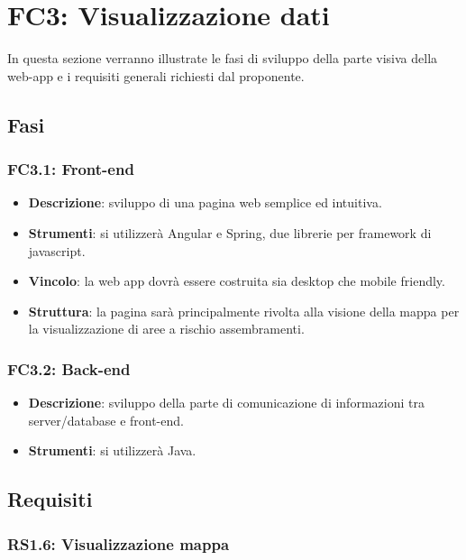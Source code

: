 \section{FC3: Visualizzazione dati}
In questa sezione verranno illustrate le fasi di sviluppo della parte visiva della web-app e i requisiti generali richiesti dal proponente.

\subsection{Fasi}

\subsubsection{FC3.1: Front-end}

\begin{itemize}
	\item \textbf{Descrizione}: sviluppo di una pagina web semplice ed intuitiva.
	\item \textbf{Strumenti}: si utilizzerà Angular e Spring, due librerie per framework di javascript.
	\item \textbf{Vincolo}: la web app dovrà essere costruita sia desktop che mobile friendly. 
	\item \textbf{Struttura}: la pagina sarà principalmente rivolta alla visione della mappa per la visualizzazione di aree a rischio assembramenti.
\end{itemize}

\subsubsection{FC3.2: Back-end}

\begin{itemize}
	\item \textbf{Descrizione}: sviluppo della parte di comunicazione di informazioni tra server/database e front-end.
	\item \textbf{Strumenti}: si utilizzerà Java.
\end{itemize}

\subsection{Requisiti}

\subsubsection{RS1.6: Visualizzazione mappa}

